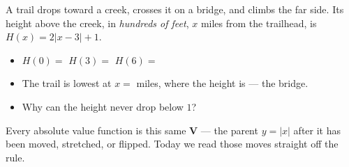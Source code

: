 \documentclass[10pt]{article}
\newcommand{\lgrid}[4]{%
  \draw[step=1, linegray!40, very thin] (#1,#3) grid (#2,#4);
  \draw[->, semithick, charcoal] (#1,0)--(#2,0) node[below right, font=\scriptsize]{$x$};
  \draw[->, semithick, charcoal] (0,#3)--(0,#4) node[left, font=\scriptsize]{$y$};}
\begin{document}
\begin{hookbox}
A trail drops toward a creek, crosses it on a bridge, and climbs the far side. Its height above
the creek, in \emph{hundreds of feet}, $x$ miles from the trailhead, is $H(x)=2|x-3|+1$.
\begin{center}
\begin{minipage}[c]{0.36\linewidth}\centering
{}
\end{minipage}\hfill
\begin{minipage}[c]{0.60\linewidth}
\begin{itemize}\setlength{\itemsep}{2pt}
  \item $H(0)=$ \blank{1.0cm} \quad $H(3)=$ \blank{1.0cm} \quad $H(6)=$ \blank{1.0cm}
  \item The trail is lowest at $x=$ \blank{0.9cm} miles, where the height is \blank{0.9cm}
        --- the bridge.
  \item Why can the height never drop below $1$? \blank{4.0cm}
\end{itemize}
\end{minipage}
\end{center}
Every absolute value function is this same \textbf{V} --- the parent $y=|x|$ after it has been
moved, stretched, or flipped. Today we read those moves straight off the rule.
\end{hookbox}
\end{document}
